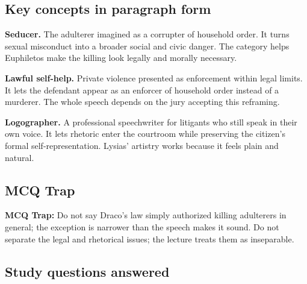 \documentclass[11pt]{article}
\begin{document}
\subsection{Key concepts in paragraph form}

\textbf{Seducer.} The adulterer imagined as a corrupter of household order. It turns sexual misconduct into a broader social and civic danger. The category helps Euphiletos make the killing look legally and morally necessary.

\textbf{Lawful self-help.} Private violence presented as enforcement within legal limits. It lets the defendant appear as an enforcer of household order instead of a murderer. The whole speech depends on the jury accepting this reframing.

\textbf{Logographer.} A professional speechwriter for litigants who still speak in their own voice. It lets rhetoric enter the courtroom while preserving the citizen's formal self-representation. Lysias' artistry works because it feels plain and natural.

\subsection{MCQ Trap}

\begin{quotebox}
\textbf{MCQ Trap:} Do not say Draco's law simply authorized killing adulterers in general; the exception is narrower than the speech makes it sound. Do not separate the legal and rhetorical issues; the lecture treats them as inseparable.
\end{quotebox}

\subsection{Study questions answered}
\end{document}
